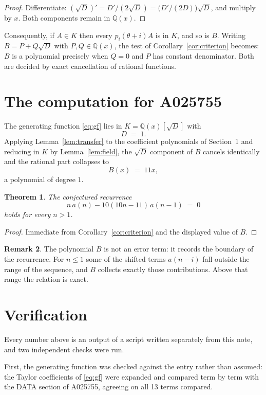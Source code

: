 \documentclass[11pt,a4paper]{article}
\theoremstyle{plain}
\newtheorem{theorem}{Theorem}
\theoremstyle{definition}
\newtheorem{remark}[theorem]{Remark}
\begin{document}
\begin{proof}
Differentiate: $(\sqrt{D})'=D'/(2\sqrt{D})=\bigl(D'/(2D)\bigr)\sqrt{D}$, and multiply by
$x$. Both components remain in $\mathbb{Q}(x)$.
\end{proof}

Consequently, if $A\in K$ then every $p_{i}(\theta+i)A$ is in $K$, and so is $B$. Writing
$B=P+Q\sqrt{D}$ with $P,Q\in\mathbb{Q}(x)$, the test of Corollary~\ref{cor:criterion}
becomes: $B$ is a polynomial precisely when $Q=0$ and $P$ has constant denominator. Both
are decided by exact cancellation of rational functions.

\section{The computation for A025755}

The generating function \eqref{eq:gf} lies in $K=\mathbb{Q}(x)[\sqrt{D}]$ with
\[
D \;=\; 1 .
\]
Applying Lemma~\ref{lem:transfer} to the coefficient polynomials of Section~1 and reducing
in $K$ by Lemma~\ref{lem:field}, the $\sqrt{D}$ component of $B$ cancels identically and
the rational part collapses to
\[
B(x)\;=\;11 x ,
\]
a polynomial of degree $1$.

\begin{theorem}
The conjectured recurrence
\[
n\,a(n) -  10 \left(10 n - 11\right)\,a(n-1) \;=\;0
\]
holds for every $n>1$.
\end{theorem}

\begin{proof}
Immediate from Corollary~\ref{cor:criterion} and the displayed value of $B$.
\end{proof}

\begin{remark}
The polynomial $B$ is not an error term: it records the boundary of the recurrence. For
$n\le1$ some of the shifted terms $a(n-i)$ fall outside the range of the sequence,
and $B$ collects exactly those contributions. Above that range the relation is exact.
\end{remark}

\section{Verification}

Every number above is an output of a script written separately from this note, and two
independent checks were run.

First, the generating function was checked against the entry rather than assumed: the
Taylor coefficients of \eqref{eq:gf} were expanded and compared term by term with the DATA
section of A025755, agreeing on all 13 terms compared.
\end{document}
